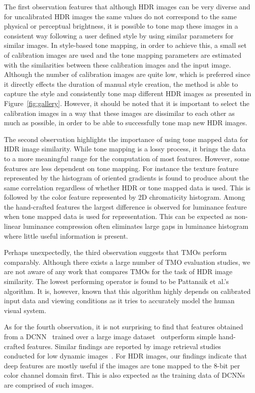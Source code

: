 The first observation features that although HDR images can be very diverse and for uncalibrated HDR images the same values do not correspond to the same physical or perceptual brightness, it is possible to tone map these images in a consistent way following a user defined style by using similar parameters for similar images. In style-based tone mapping, in order to achieve this, a small set of calibration images are used and the tone mapping parameters are estimated with the similarities between these calibration images and the input image. Although the number of calibration images are quite low, which is preferred since it directly effects the duration of manual style creation, the method is able to capture the style and consistently tone map different HDR images as presented in Figure~\ref{fig:gallery}. However, it should be noted that it is important to select the calibration images in a way that these images are dissimilar to each other as much as possible, in order to be able to successfully tone map new HDR images.

The second observation highlights the importance of using tone mapped data for HDR image similarity. While tone mapping is a lossy process, it brings the data to a more meaningful range for the computation of most features. However, some features are less dependent on tone mapping. For instance the texture feature represented by the histogram of oriented gradients is found to produce about the same correlation regardless of whether HDR or tone mapped data is used. This is followed by the color feature represented by 2D chromaticity histogram. Among the hand-crafted features the largest difference is  observed for luminance feature when tone mapped data is used for representation. This can be expected as non-linear luminance compression often eliminates large gaps in luminance histogram where little useful information is present.

Perhaps unexpectedly, the third observation suggests that TMOs perform comparably. Although there exists a large number of TMO evaluation studies, we are not aware of any work that compares TMOs for the task of HDR image similarity. The lowest performing operator is found to be Pattanaik et al.'s~\cite{pattanaik2000time} algorithm. It is, however, known that this algorithm highly depends on calibrated input data and viewing conditions as it tries to accurately model the human visual system.

As for the fourth observation, it is not surprising to find that features obtained from a DCNN~\cite{simonyan2014very} trained over a large image dataset~\cite{russakovsky2015imagenet} outperform simple hand-crafted features. Similar findings are reported by image retrieval studies conducted for low dynamic images~\cite{wan2014deep,gordo2016deep}. For HDR images, our findings indicate that deep features are mostly useful if the images are tone mapped to the 8-bit per color channel domain first. This is also expected as the training data of DCNNs are comprised of such images.

